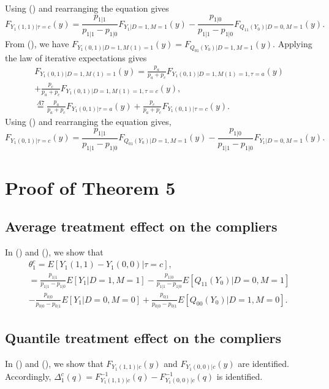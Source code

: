 \documentclass[a4paper,12pt]{article}
\begin{document}
 \doublespacing \pagestyle{plain}
Using () and rearranging the equation gives
\begin{equation}
F_{Y_{1}(1,1)|\tau=c}(y)= \frac{p_{1|1}}{p_{1|1} - p_{1|0}} F_{Y_{1}|D=1,M=1}(y) - \frac{p_{1|0} }{p_{1|1} - p_{1|0}}F_{Q_{11}(Y_0)|D=0,M=1}(y) . 
\end{equation}
From (), we have $F_{Y_{1}(0,1)|D=1,M(1)=1}(y)  =F_{Q_{01}(Y_{0})|D=1,M=1}(y)$. Applying the law of iterative expectations gives
\begin{align*}
F_{Y_{1}(0,1)|D=1,M(1)=1}(y)   =\frac{p_a}{p_a + p_c} F_{Y_{1}(0,1)|D=1,M(1)=1,\tau=a}(y)
\\  +\frac{p_c}{p_a + p_c} F_{Y_{1}(0,1)|D=1,M(1)=1,\tau=c}(y),\\
 \stackrel{A7}{=} \frac{p_a}{p_a + p_c} F_{Y_{1}(0,1)|\tau=a}(y) +\frac{p_c}{p_a + p_c} F_{Y_{1}(0,1)|\tau=c}(y).
\end{align*}
Using () and rearranging the equation gives,
\begin{equation} 
F_{Y_{1}(0,1)|\tau=c}(y) = \frac{p_{1|1}}{p_{1|1} - p_{1|0}}  F_{Q_{01}(Y_{0})|D=1,M=1}(y) - \frac{p_{1|0}}{ p_{1|1} - p_{1|0}}  F_{Y_1|D=0,M=1}(y).
\end{equation}
\section{Proof of Theorem 5 }
\subsection{Average treatment effect on the compliers}
In () and (), we show that
\begin{align*}
\theta_1^c=  E[Y_1(1,1) -Y_1(0,0)|\tau=c], \\ = \frac{p_{1|1}}{ p_{1|1} - p_{1|0}} E[Y_1|D=1,M=1] -\frac{p_{1|0}}{p_{1|1} - p_{1|0}}E[Q_{11}(Y_0)|D=0,M=1] \\
 − \frac{p_{0|0}}{ p_{0|0} - p_{0|1}} E[Y_1|D=0,M=0] +\frac{p_{0|1}}{p_{0|0} - p_{0|1}}E[Q_{00}(Y_0)|D=1,M=0] .
\end{align*}
\subsection{Quantile treatment effect on the compliers}
In () and (), we show that $F_{Y_{1}(1,1)|c}(y)$ and $F_{Y_{1}(0,0)|c}(y)$ are identified. Accordingly, $\Delta_1^{c}(q) = F_{Y_{1}(1,1)|c}^{-1}(q)-F_{Y_{1}(0,0)|c}^{-1}(q)$ is identified.
\end{document}
